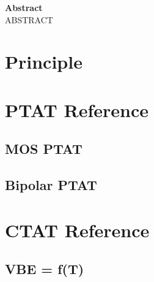 \documentclass[11pt,a4paper]{report}
\begin{document}

{}
\renewcommand{\contentsname}{Sommaire}
\tableofcontents


% 
% 
% 
% 
% 

\newpage
% 
\vspace{3cm}
\textbf{Abstract} \\
\newline
\hspace*{17pt} ABSTRACT

\listoffigures

\listoftables


\newpage


\chapter{Principle}
\chapter{PTAT Reference}
\section{MOS PTAT}
\section{Bipolar PTAT}
\chapter{CTAT Reference}
\section{VBE = f(T) }
\end{document}
